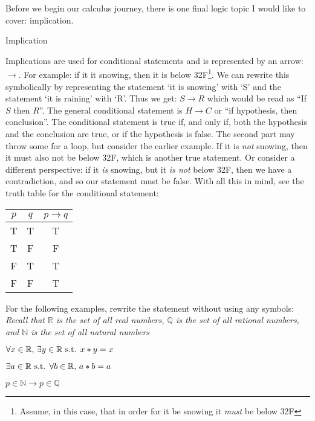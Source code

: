 Before we begin our calculus journey, there is one final logic topic I would like to cover: implication. 

\begin{definition}{Implication}{}
  
  Implications are used for conditional statements and is represented by an arrow: $\to$. For example: if it it snowing, then it is below 32\degree F\footnote{Assume, in this case, that in order for it be snowing it \textit{must} be below 32\degree F}. We can rewrite this symbolically by representing the statement `it is snowing' with `S' and the statement `it is raining' with `R'. Thus we get: $S \to R$ which would be read as ``If $S$ then $R$''. The general conditional statement is $H \to C$ or ``if hypothesis, then conclusion''. The conditional statement is true if, and only if, both the hypothesis and the conclusion are true, or if the hypothesis is false. The second part may throw some for a loop, but consider the earlier example. If it is \textit{not} snowing, then it must also not be below 32\degree F, which is another true statement. Or consider a different perspective: if it \textit{is} snowing, but it \textit{is not} below 32\degree F, then we have a contradiction, and so our statement must be false. With all this in mind, see the truth table for the conditional statement:
  \vspace{0.01in}
  \begin{center}
    \begin{tabular}{ |c|c|c| } 
      \hline
      $p$ & $q$ & $p \to q$ \\ 
      \hline
      T & T & T \\ 
      T & F & F \\ 
      F & T & T \\ 
      F & F & T \\ 
      \hline
    \end{tabular}
  \end{center}
  \vspace{0.01in}
\end{definition}

For the following examples, rewrite the statement without using any symbols: \\
\small \textit{Recall that $\mathbb{R}$ is the set of all real numbers, $\mathbb{Q}$ is the set of all rational numbers, and $\mathbb{N}$ is the set of all natural numbers}
\begin{questions}
  \question $\forall x \in \mathbb{R}\text{, } \exists y \in \mathbb{R} \text{ s.t. } x * y = x$
  \qspace 
  
  \question $\exists a \in \mathbb{R} \text{ s.t. } \forall b \in \mathbb{R}\text{, } a * b = a$ 
  \qspace

  \question $p \in \mathbb{N} \to p \in \mathbb{Q}$
  \qspace
\end{questions}